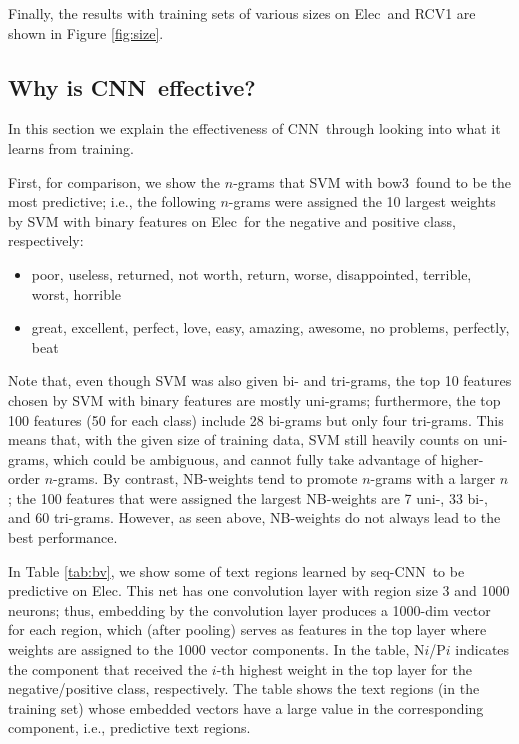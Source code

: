 \documentclass[11pt,letterpaper]{article}
\newcommand{\cnn}{CNN}
\newcommand{\scnn}{seq-CNN}
\newcommand{\bowthree}{{bow3}}
\newcommand{\Elec}{Elec}
\begin{document}
Finally, the results with training sets of various sizes on \Elec\ and RCV1 
are shown in Figure \ref{fig:size}.



\subsection{Why is \cnn\ effective?} 
\label{sec:examples}
In this section we explain the effectiveness of \cnn\ through 
looking into what it learns from training.  

First, for comparison,
we show the $n$-grams that SVM with \bowthree\ found to be the most predictive; i.e., 
the following $n$-grams were assigned the 10 largest weights by SVM with binary features on \Elec\ 
for the negative and positive class, respectively: 
\vspace{-0.1in}
\begin{itemize} \itemsep1pt \parskip0pt 
\item 
{\small
  poor, useless, returned, not worth, return, worse, disappointed, terrible, worst, horrible  }
\item
{\small
  great, excellent, perfect, love, easy, amazing, awesome, no problems, perfectly, beat
}  
\end{itemize}
\vspace{-0.05in}
Note that, even though SVM was also given bi- and tri-grams, 
the top 10 features chosen by SVM with binary features are mostly uni-grams; 
furthermore, the top 100 features (50 for each class) include 28 bi-grams but only four tri-grams. 
This means that, with the given size of training data, SVM still heavily counts on 
uni-grams, which could be ambiguous, and cannot fully take advantage of higher-order 
$n$-grams.
By contrast, 
NB-weights tend to promote $n$-grams with a larger $n$; the 100 features that were assigned 
the largest NB-weights are 7 uni-, 33 bi-, and 60 tri-grams.  
However, as seen above, NB-weights do not always lead to the best performance.  

In Table \ref{tab:bv}, 
we show some of text regions learned by \scnn\ to be predictive on \Elec.  
This net has one convolution layer with region size 3 and 1000 neurons; 
thus, embedding by the convolution layer produces a 1000-dim vector 
for each region, which (after pooling) serves as features in the top layer
where weights are assigned to the 1000 vector components.  
In the table, N$i$/P$i$ indicates the component that received 
the $i$-th highest weight in the top layer 
for the negative/positive class, respectively. The table shows the text regions 
(in the training set) whose embedded vectors have a large value
in the corresponding component, i.e., predictive text regions.  
\end{document}
